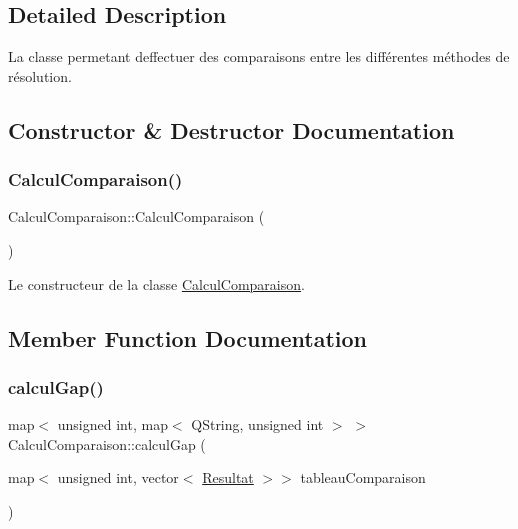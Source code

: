 \subsection{Detailed Description}
La classe permetant d\textquotesingle{}effectuer des comparaisons entre les différentes méthodes de résolution. 

\subsection{Constructor \& Destructor Documentation}
\mbox{\label{classCalculComparaison_af2712af8a2e61a46bae912a4784cc285}} 
\subsubsection{\texorpdfstring{Calcul\+Comparaison()}{CalculComparaison()}}
{\footnotesize\ttfamily Calcul\+Comparaison\+::\+Calcul\+Comparaison (\begin{DoxyParamCaption}{ }\end{DoxyParamCaption})}



Le constructeur de la classe \hyperlink{classCalculComparaison}{Calcul\+Comparaison}. 



\subsection{Member Function Documentation}
\mbox{\label{classCalculComparaison_ada2ba7f37482b4261450e38a8aeed123}} 
\subsubsection{\texorpdfstring{calcul\+Gap()}{calculGap()}}
{\footnotesize\ttfamily map$<$ unsigned int, map$<$ Q\+String, unsigned int $>$ $>$ Calcul\+Comparaison\+::calcul\+Gap (\begin{DoxyParamCaption}\item[{map$<$ unsigned int, vector$<$ \hyperlink{classResultat}{Resultat} $>$$>$}]{tableau\+Comparaison }\end{DoxyParamCaption})}



